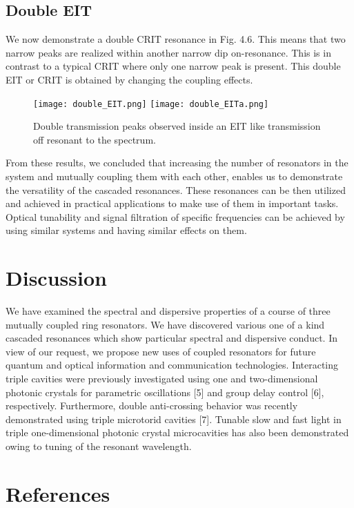 \subsection{Double EIT}
We now demonstrate a double CRIT resonance in Fig. 4.6. This means that two narrow peaks are realized within another narrow dip on-resonance. This is in contrast to a typical CRIT where only one narrow peak is present. This double EIT or CRIT is obtained by changing the coupling effects. 

\begin{figure}[t]
\centering
\texttt{[image: double\_EIT.png]}
\texttt{[image: double\_EITa.png]}
\caption{Double transmission peaks observed inside an EIT like transmission off resonant to the spectrum.}
\end{figure}


From these results, we concluded that increasing the number of resonators in the system and mutually coupling them with each other, enables us to demonstrate the versatility of the cascaded resonances. These resonances can be then utilized and achieved in practical applications to make use of them in important tasks. Optical tunability and signal filtration of specific frequencies can be achieved by using similar systems and having similar effects on them.

\newpage
\section{Discussion}
We have examined the spectral and dispersive properties of a course of three mutually coupled ring resonators. We have discovered various one of a kind cascaded resonances which show particular spectral and dispersive conduct. In view of our request, we propose new uses of coupled resonators for future quantum and optical information and communication technologies. Interacting triple cavities were previously investigated using one and two-dimensional photonic crystals for parametric oscillations [5] and group delay control [6], respectively. Furthermore, double anti-crossing behavior was recently demonstrated using triple microtorid cavities [7]. Tunable slow and fast light in triple one-dimensional photonic crystal microcavities has also been demonstrated owing to tuning of the resonant wavelength.

\newpage
\section*{References}

